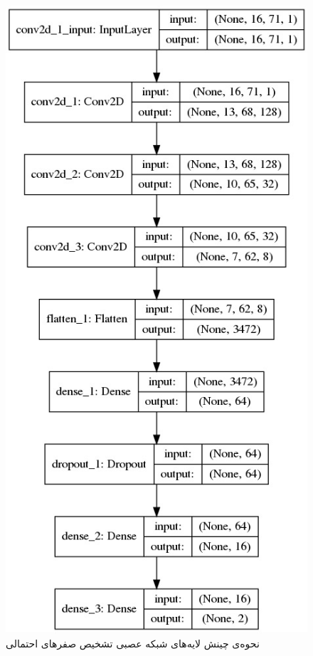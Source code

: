 \begin{figure}[!h]
	\centering
	\includegraphics[scale=0.63]{section3/model.jpg}
	\caption{
نحوه‌ی چینش لایه‌های شبکه عصبی تشخیص صفرهای احتمالی}
	\label{CNNModel}
\end{figure}

